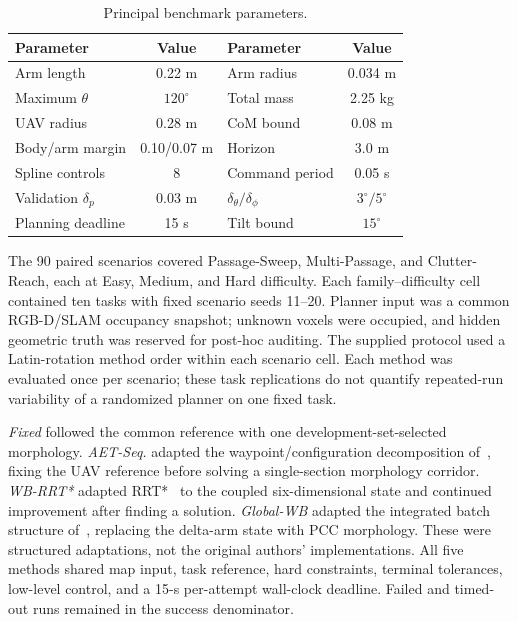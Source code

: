 \documentclass[journal,twoside]{IEEEtran}
\begin{document}
\begin{table}[t]
\centering
\caption{Principal benchmark parameters.}
\label{tab:parameters}
\small
\begin{tabular}{lc@{\quad}lc}
\toprule
Parameter & Value & Parameter & Value\\\midrule
Arm length & 0.22 m & Arm radius & 0.034 m\\
Maximum $\theta$ & $120^\circ$ & Total mass & 2.25 kg\\
UAV radius & 0.28 m & CoM bound & 0.08 m\\
Body/arm margin & 0.10/0.07 m & Horizon & 3.0 m\\
Spline controls & 8 & Command period & 0.05 s\\
Validation $\delta_p$ & 0.03 m & $\delta_\theta/\delta_\phi$ & $3^\circ/5^\circ$\\
Planning deadline & 15 s & Tilt bound & $15^\circ$\\\bottomrule
\end{tabular}
\end{table}

The 90 paired scenarios covered Passage-Sweep, Multi-Passage, and Clutter-Reach, each at Easy, Medium, and Hard difficulty. Each family--difficulty cell contained ten tasks with fixed scenario seeds 11--20. Planner input was a common RGB-D/SLAM occupancy snapshot; unknown voxels were occupied, and hidden geometric truth was reserved for post-hoc auditing. The supplied protocol used a Latin-rotation method order within each scenario cell. Each method was evaluated once per scenario; these task replications do not quantify repeated-run variability of a randomized planner on one fixed task.

\emph{Fixed} followed the common reference with one development-set-selected morphology. \emph{AET-Seq.} adapted the waypoint/configuration decomposition of~\cite{peng2025aet}, fixing the UAV reference before solving a single-section morphology corridor. \emph{WB-RRT*} adapted RRT*~\cite{karaman2011sampling,meng2022rrtstar} to the coupled six-dimensional state and continued improvement after finding a solution. \emph{Global-WB} adapted the integrated batch structure of~\cite{deng2025wholebody}, replacing the delta-arm state with PCC morphology. These were structured adaptations, not the original authors' implementations. All five methods shared map input, task reference, hard constraints, terminal tolerances, low-level control, and a 15-s per-attempt wall-clock deadline. Failed and timed-out runs remained in the success denominator.
\end{document}
